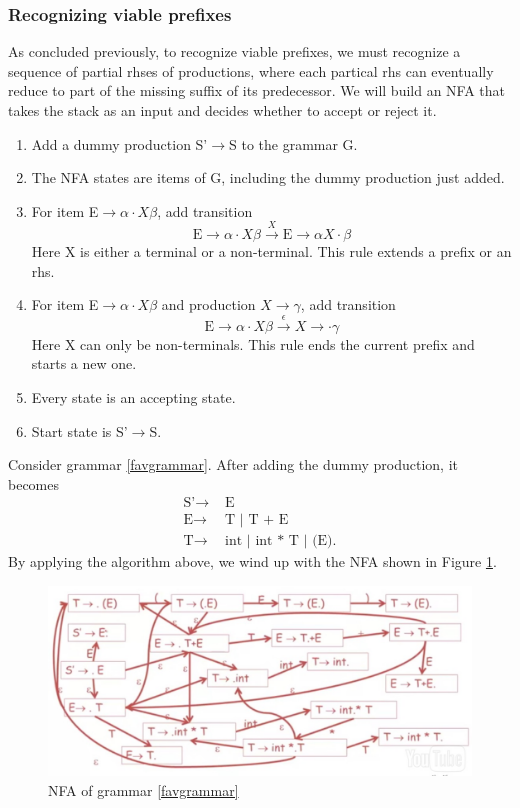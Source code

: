 \subsubsection{Recognizing viable prefixes}
As concluded previously, to recognize viable prefixes, we must recognize a sequence of partial rhses of productions, where each partical rhs can eventually reduce to part of the missing suffix of its predecessor. We will build an NFA that takes the stack as an input and decides whether to accept or reject it.
\begin{enumerate}
\item Add a dummy production S'$\rightarrow$S to the grammar G.
\item The NFA states are items of G, including the dummy production just added.
\item For item E$\rightarrow\alpha\cdot X\beta$, add transition
\begin{equation*}
\text{E}\rightarrow\alpha \cdot X\beta\xrightarrow{X}\text{E}\rightarrow\alpha X\cdot\beta
\end{equation*}
Here X is either a terminal or a non-terminal. This rule extends a prefix or an rhs.
\item For item E$\rightarrow\alpha\cdot X\beta$ and production $X\rightarrow\gamma$, add transition
\begin{equation*}
\text{E}\rightarrow\alpha \cdot X\beta\xrightarrow{\epsilon}X\rightarrow\cdot\gamma
\end{equation*}
Here X can only be non-terminals. This rule ends the current prefix and starts a new one.
\item Every state is an accepting state.
\item Start state is S'$\rightarrow$S. 
\end{enumerate}
Consider grammar \eqref{favgrammar}. After adding the dummy production, it becomes
\begin{equation}\begin{split}
\text{S'}\rightarrow&\text{ E}\\
\text{E}\rightarrow&\text{ T }|\text{ T + E }\\\text{T}\rightarrow&\text{ int }|\text{ int * T }|\text{ (E).}
\end{split}\end{equation}
By applying the algorithm above, we wind up with the NFA shown in Figure \ref{nfa}.
\begin{figure}[ht]
\centering
\includegraphics[width = \textwidth]{nfa.jpg}
\caption{NFA of grammar \eqref{favgrammar}}\label{nfa}
\end{figure}

